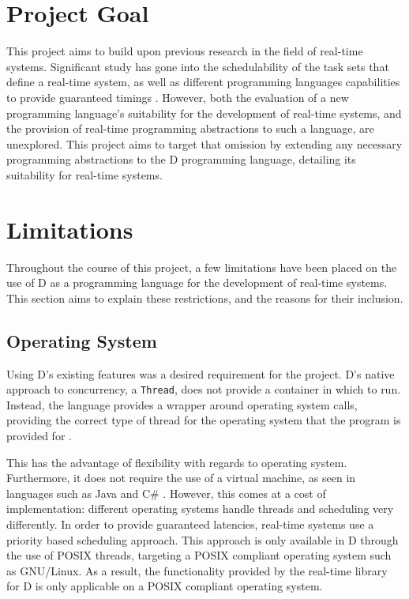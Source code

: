\section{Project Goal} %
This project aims to build upon previous research in the field of real-time systems. 
Significant study has gone into the schedulability of the task sets that 
define a real-time system, as well as different programming languages capabilities 
to provide guaranteed timings \cite{burns-sched-analysis,atc-article}. 
However, both the evaluation of a new programming language's suitability for the 
development of real-time systems, and the provision of real-time programming 
abstractions to such a language, are unexplored. 
This project aims to target that 
omission by extending any necessary programming abstractions to the D programming 
language, detailing its suitability for real-time systems.
\section{Limitations} %
Throughout the course of this project, a few limitations have been placed on the 
use of D as a programming language for the development of real-time systems. 
This section aims to explain these restrictions, and the reasons for
their inclusion.
\subsection{Operating System}
Using D's existing features was a desired requirement for the project. 
D's native approach to concurrency, a \texttt{Thread}, does not provide a
container in which to run. 
Instead, the language provides a wrapper around operating system calls, 
providing the correct type of thread for the operating system
that the program is provided for \cite{github-core-thread}. 
\par\bigskip\noindent
This has the advantage of flexibility with regards to operating system.
Furthermore, it does not require the use of a virtual machine, as seen in languages such as 
Java and C\# \cite{zhang2007exploiting}. However, this comes at a cost of implementation: 
different operating systems handle threads and scheduling very differently. 
In order to provide guaranteed latencies, real-time systems use a priority based 
scheduling approach. This approach is only available in D through the use of 
POSIX threads, targeting a POSIX compliant operating system such as GNU/Linux. 
As a result, the functionality provided by the real-time library for D is only 
applicable on a POSIX compliant operating system.

